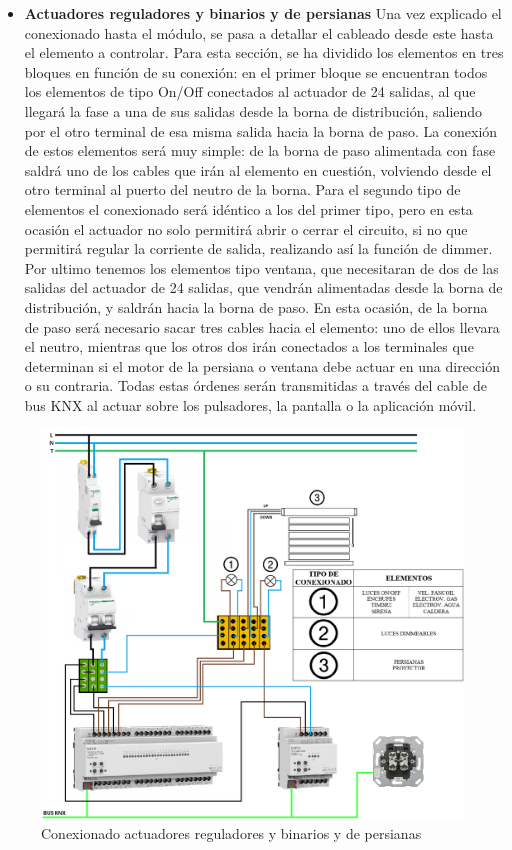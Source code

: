 \begin{itemize}
\item \textbf{Actuadores reguladores y binarios y de persianas} 
Una vez explicado el conexionado hasta el módulo, se pasa a detallar el cableado desde este hasta el elemento a controlar. Para esta sección, se ha dividido los elementos en tres bloques en función de su conexión: en el primer bloque se encuentran todos los elementos de tipo On/Off conectados al actuador de 24 salidas, al que llegará la fase a una de sus salidas desde la borna de distribución, saliendo por el otro terminal de esa misma salida hacia la borna de paso. La conexión de estos elementos será muy simple: de la borna de paso alimentada con fase saldrá uno de los cables que irán al elemento en cuestión, volviendo desde el otro terminal al puerto del neutro de la borna. Para el segundo tipo de elementos el conexionado será idéntico a los del primer tipo, pero en esta ocasión el actuador no solo permitirá abrir o cerrar el circuito, si no que permitirá regular la corriente de salida, realizando así la función de dimmer. Por ultimo tenemos los elementos tipo ventana, que necesitaran de dos de las salidas del actuador de 24 salidas, que vendrán alimentadas desde la borna de distribución, y saldrán hacia la borna de paso. En esta ocasión, de la borna de paso será necesario sacar tres cables hacia el elemento: uno de ellos llevara el neutro, mientras que los otros dos irán conectados a los terminales que determinan si el motor de la persiana o ventana debe actuar en una dirección o su contraria. Todas estas órdenes serán transmitidas a través del cable de bus KNX al actuar sobre los pulsadores, la pantalla o la aplicación móvil.
\end{itemize}

\begin{flushleft}
\begin{figure}[H]
\includegraphics[width=1.15\textwidth]{figures/conex_ilu.png}   
\caption{Conexionado actuadores reguladores y binarios y de persianas}
\label{fig:conex_ilu}
\end{figure}
\end{flushleft}

